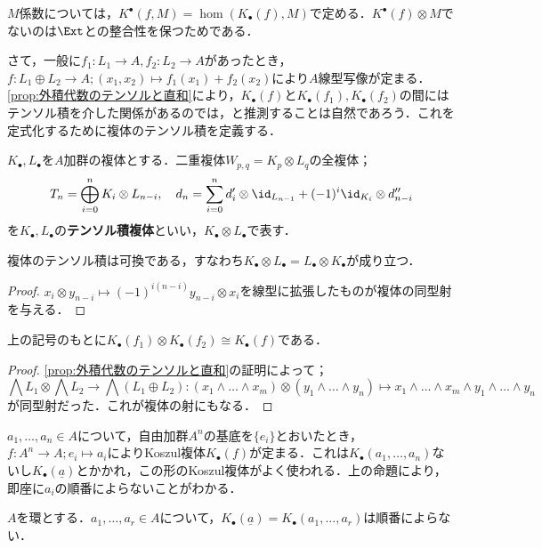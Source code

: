 $M$係数については，$K^\bullet(f,M)=\hom(K_\bullet(f),M)$で定める．$K^\bullet(f)\otimes M$でないのは$\Ext$との整合性を保つためである．

さて，一般に$f_1:L_1\to A,f_2:L_2\to A$があったとき，$f:L_1\oplus L_2\to A;(x_1,x_2)\mapsto f_1(x_1)+f_2(x_2)$により$A$線型写像が定まる．\ref{prop:外積代数のテンソルと直和}により，$K_\bullet(f)$と$K_\bullet(f_1),K_\bullet(f_2)$の間にはテンソル積を介した関係があるのでは，と推測することは自然であろう．これを定式化するために複体のテンソル積を定義する．
\begin{defi}[複体のテンソル積]
	$K_\bullet,L_\bullet$を$A$加群の複体とする．二重複体$W_{p,q}=K_p\otimes L_q$の全複体；
	\[T_n=\bigoplus_{i=0}^n K_i\otimes L_{n-i},\quad d_n=\sum_{i=0}^n d'_i\otimes\id_{L_{n-1}}+(-1)^i\id_{K_i}\otimes d''_{{n-i}}\]
	を$K_\bullet, L_\bullet$の\textbf{テンソル積複体}といい，$K_\bullet\otimes L_\bullet$で表す．
\end{defi}

\begin{prop}
	複体のテンソル積は可換である，すなわち$K_\bullet\otimes L_\bullet=L_\bullet\otimes K_\bullet$が成り立つ．
\end{prop}

\begin{proof}
	$x_i\otimes y_{n-i}\mapsto (-1)^{i(n-i)}y_{n-i}\otimes x_i$を線型に拡張したものが複体の同型射を与える．
\end{proof}

\begin{prop}
	上の記号のもとに$K_\bullet(f_1)\otimes K_\bullet(f_2)\cong K_\bullet(f)$である．
\end{prop}
\begin{proof}
	\ref{prop:外積代数のテンソルと直和}の証明によって；
	\[\bigwedge L_1\otimes\bigwedge L_2\to\bigwedge (L_1\oplus L_2):(x_1\wedge\dots\wedge x_m)\otimes(y_1\wedge\dots\wedge y_n)\mapsto x_1\wedge\dots\wedge x_m\wedge y_1\wedge\dots\wedge y_n\]
	が同型射だった．これが複体の射にもなる． 
\end{proof}

$a_1,\dots,a_n\in A$について，自由加群$A^n$の基底を$\{e_i\}$とおいたとき，$f:A^n\to A;e_i\mapsto a_i$によりKoszul複体$K_\bullet(f)$が定まる．これは$K_\bullet(a_1,\dots,a_n)$ないし$K_\bullet(\underline{a})$とかかれ，この形のKoszul複体がよく使われる．上の命題により，即座に$a_i$の順番によらないことがわかる．

\begin{cor}
	$A$を環とする．$a_1,\dots,a_r\in A$について，$K_\bullet(\underline{a})=K_\bullet(a_1,\dots,a_r)$は順番によらない．
\end{cor}

